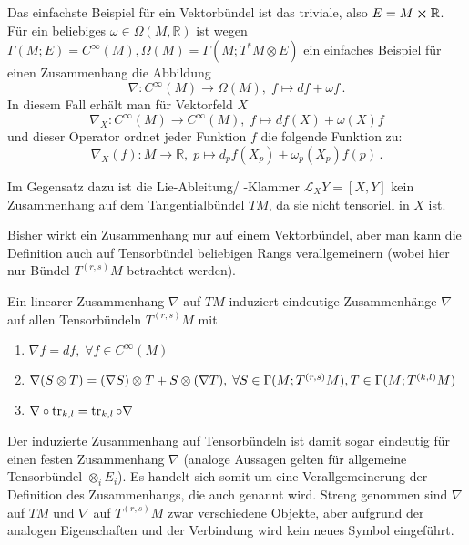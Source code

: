 \documentclass[../H_Analysis_main.tex]{subfiles}
\begin{document}
\begin{bsp}
Das einfachste Beispiel für ein Vektorbündel ist das triviale, also $E = M \cross \mathbb{R}$. Für ein beliebiges $\omega \in \Omega(M, \mathbb{R})$ ist wegen $\Gamma(M; E) = C^\infty(M), \Omega(M) = \Gamma(M; T^* M \otimes E)$ ein einfaches Beispiel für einen Zusammenhang die Abbildung
\begin{equation*}
\nabla: C^\infty(M) \rightarrow \Omega(M), \; f \mapsto df + \omega f \, .
\end{equation*}
In diesem Fall erhält man für Vektorfeld $X$
\begin{equation*}
\nabla_X: C^\infty(M) \rightarrow C^\infty(M), \; f \mapsto df(X) + \omega(X) f
\end{equation*}
und dieser Operator ordnet jeder Funktion $f$ die folgende Funktion zu:
\begin{equation*}
\nabla_X(f): M \rightarrow \mathbb{R}, \; p \mapsto d_p f(X_p) + \omega_p(X_p) f(p) \, .
\end{equation*}

Im Gegensatz dazu ist die Lie-Ableitung/ -Klammer $\mathcal{L}_X Y = [X, Y]$ kein Zusammenhang auf dem Tangentialbündel $TM$, da sie nicht tensoriell in $X$ ist.
\end{bsp}



Bisher wirkt ein Zusammenhang nur auf einem Vektorbündel, aber man kann die Definition auch auf Tensorbündel beliebigen Rangs verallgemeinern (wobei hier nur Bündel $T^{(r, s)}M$ betrachtet werden).

\begin{satz}
Ein linearer Zusammenhang $\nabla$ auf $TM$ induziert eindeutige Zusammenhänge $\nabla$ auf allen Tensorbündeln $T^{(r, s)}M$ mit
\begin{enumerate}
\item $\nabla f = df, \; \forall f \in C^\infty(M)$

\item $\nabla \qty(S \otimes T) = \qty(\nabla S) \otimes T + S \otimes \qty(\nabla T), \; \forall S \in \Gamma(M; T^{(r, s)} M), T \in \Gamma(M; T^{(k, l)} M)$

\item $\nabla \circ \tr_{k, l} = \tr_{k, l} \circ \nabla$
\end{enumerate}
\end{satz}
Der induzierte Zusammenhang auf Tensorbündeln ist damit sogar eindeutig für einen festen Zusammenhang $\nabla$ (analoge Aussagen gelten für allgemeine Tensorbündel $\otimes_i E_i$). Es handelt sich somit um eine Verallgemeinerung der Definition des Zusammenhangs, die auch  genannt wird. 
Streng genommen sind $\nabla$ auf $TM$ und $\nabla$ auf $T^{(r, s)}M$ zwar verschiedene Objekte, aber aufgrund der analogen Eigenschaften und der Verbindung wird kein neues Symbol eingeführt.
\end{document}
